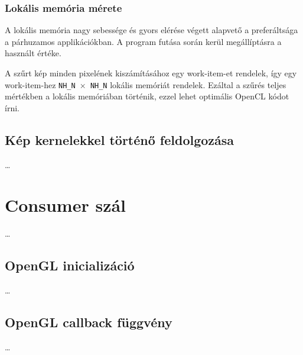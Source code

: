 	\subsubsection{Lokális memória mérete}
	A lokális memória nagy sebessége és gyors elérése végett alapvető a preferáltsága a párhuzamos applikációkban.
	A program futása során kerül megállíptásra a használt értéke.
	
	A szűrt kép minden pixelének kiszámításához egy work-item-et rendelek, így egy work-item-hez \texttt{NH\_N $\times$ NH\_N}
	lokális memóriát rendelek. Ezáltal a szűrés teljes mértékben a lokális memóriában történik, ezzel lehet optimális OpenCL kódot írni.
	
	\subsection{Kép kernelekkel történő feldolgozása}
	\ldots
	


\section{Consumer szál}
	\dots
	\subsection*{OpenGL inicializáció}
	\ldots
	
	\subsection*{OpenGL callback függvény}
	\dots
